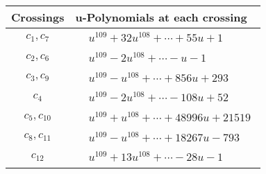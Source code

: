 \documentclass[1p]{elsarticle_modified}
\theoremstyle{definition}
\begin{document}
\begin{tabular}{m{50pt}|m{274pt}}
Crossings & \hspace{64pt}u-Polynomials at each crossing \\
\hline $$\begin{aligned}c_{1},c_{7}\end{aligned}$$&$\begin{aligned}
&u^{109}+32 u^{108}+\cdots+55 u+1
\end{aligned}$\\
\hline $$\begin{aligned}c_{2},c_{6}\end{aligned}$$&$\begin{aligned}
&u^{109}-2 u^{108}+\cdots- u-1
\end{aligned}$\\
\hline $$\begin{aligned}c_{3},c_{9}\end{aligned}$$&$\begin{aligned}
&u^{109}- u^{108}+\cdots+856 u+293
\end{aligned}$\\
\hline $$\begin{aligned}c_{4}\end{aligned}$$&$\begin{aligned}
&u^{109}-2 u^{108}+\cdots-108 u+52
\end{aligned}$\\
\hline $$\begin{aligned}c_{5},c_{10}\end{aligned}$$&$\begin{aligned}
&u^{109}+u^{108}+\cdots+48996 u+21519
\end{aligned}$\\
\hline $$\begin{aligned}c_{8},c_{11}\end{aligned}$$&$\begin{aligned}
&u^{109}- u^{108}+\cdots+18267 u-793
\end{aligned}$\\
\hline $$\begin{aligned}c_{12}\end{aligned}$$&$\begin{aligned}
&u^{109}+13 u^{108}+\cdots-28 u-1
\end{aligned}$\\
\hline
\end{tabular}\\~\\
\newpage\renewcommand{\arraystretch}{1}
\end{document}
